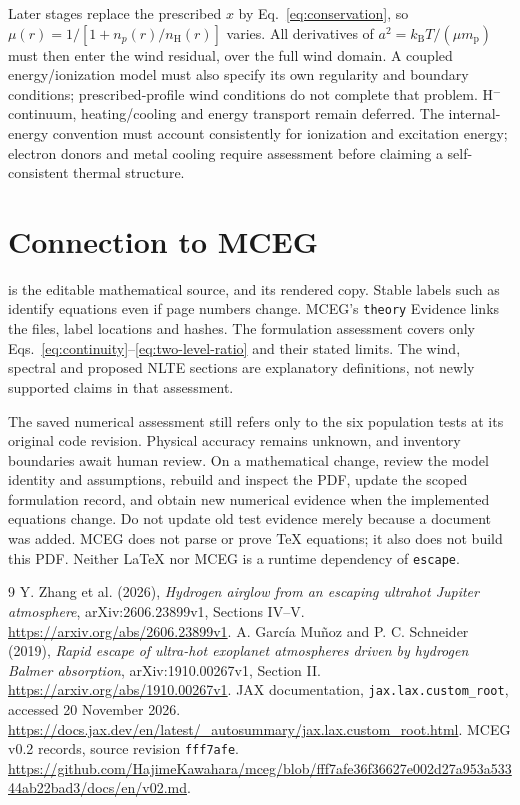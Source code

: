 \documentclass[11pt,a4paper]{article}
\newcommand{\nH}{n_{\mathrm H}}
\newcommand{\kb}{k_{\mathrm B}}
\newcommand{\mpart}{m_{\mathrm p}}
\begin{document}
Later stages replace the prescribed $x$ by Eq.~\eqref{eq:conservation}, so
$\mu(r)=1/[1+n_p(r)/\nH(r)]$ varies. All derivatives of
$a^2=\kb T/(\mu\mpart)$ must then enter the wind residual, over the full wind
domain. A coupled energy/ionization model must also specify its own regularity
and boundary conditions; prescribed-profile wind conditions do not complete
that problem. H$^-$ continuum, heating/cooling and energy transport remain
deferred. The internal-energy convention must account consistently for
ionization and excitation energy; electron donors and metal cooling require
assessment before claiming a self-consistent thermal structure.

\section{Connection to MCEG}\label{sec:mceg}
 is the editable mathematical source, and
 its rendered copy. Stable labels such as
 identify equations even if page numbers change.
MCEG's \texttt{theory} Evidence links the files, label locations and hashes.
The formulation assessment covers only
Eqs.~\eqref{eq:continuity}--\eqref{eq:two-level-ratio} and their stated limits.
The wind, spectral and proposed NLTE sections are explanatory definitions,
not newly supported claims in that assessment.

The saved numerical assessment still refers only to the six population
tests at its original code revision. Physical accuracy remains unknown,
and inventory boundaries await human review. On a mathematical change,
review the model identity and assumptions, rebuild and inspect the PDF,
update the scoped formulation record, and obtain new numerical evidence
when the implemented equations change. Do not update old test evidence
merely because a document was added. MCEG does not parse or prove TeX equations;
it also does not build this PDF. Neither LaTeX nor MCEG is a runtime dependency
of \texttt{escape}.

\begin{thebibliography}{9}
Y. Zhang et al. (2026), \emph{Hydrogen airglow from an escaping ultrahot
Jupiter atmosphere}, arXiv:2606.23899v1, Sections IV--V.
\url{https://arxiv.org/abs/2606.23899v1}.
A. Garc\'ia Mu\~noz and P. C. Schneider (2019), \emph{Rapid escape of ultra-hot
exoplanet atmospheres driven by hydrogen Balmer absorption},
arXiv:1910.00267v1, Section II.
\url{https://arxiv.org/abs/1910.00267v1}.
JAX documentation, \texttt{jax.lax.custom\_root}, accessed 20 November 2026.
\url{https://docs.jax.dev/en/latest/_autosummary/jax.lax.custom_root.html}.
MCEG v0.2 records, source revision \texttt{fff7afe}.
\url{https://github.com/HajimeKawahara/mceg/blob/fff7afe36f36627e002d27a953a53344ab22bad3/docs/en/v02.md}.
\end{thebibliography}
\end{document}
